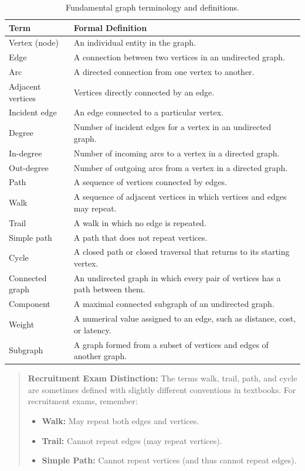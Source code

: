 \begin{table}[htbp]
\centering
\small
\begin{tabularx}{\textwidth}{l X}
\toprule
\textbf{Term} & \textbf{Formal Definition} \\
\midrule
Vertex (node)     & An individual entity in the graph. \\
Edge              & A connection between two vertices in an undirected graph. \\
Arc               & A directed connection from one vertex to another. \\
Adjacent vertices & Vertices directly connected by an edge. \\
Incident edge     & An edge connected to a particular vertex. \\
Degree            & Number of incident edges for a vertex in an undirected graph. \\
In-degree         & Number of incoming arcs to a vertex in a directed graph. \\
Out-degree        & Number of outgoing arcs from a vertex in a directed graph. \\
Path              & A sequence of vertices connected by edges. \\
Walk              & A sequence of adjacent vertices in which vertices and edges may repeat. \\
Trail             & A walk in which no edge is repeated. \\
Simple path       & A path that does not repeat vertices. \\
Cycle             & A closed path or closed traversal that returns to its starting vertex. \\
Connected graph   & An undirected graph in which every pair of vertices has a path between them. \\
Component         & A maximal connected subgraph of an undirected graph. \\
Weight            & A numerical value assigned to an edge, such as distance, cost, or latency. \\
Subgraph          & A graph formed from a subset of vertices and edges of another graph. \\
\bottomrule
\end{tabularx}
\caption{Fundamental graph terminology and definitions.}
\end{table}

\begin{quote}
\textbf{Recruitment Exam Distinction:} The terms walk, trail, path, and cycle are sometimes defined with slightly different conventions in textbooks. For recruitment exams, remember:
\begin{itemize}
    \item \textbf{Walk:} May repeat both edges and vertices.
    \item \textbf{Trail:} Cannot repeat edges (may repeat vertices).
    \item \textbf{Simple Path:} Cannot repeat vertices (and thus cannot repeat edges).
\end{itemize}
\end{quote}

